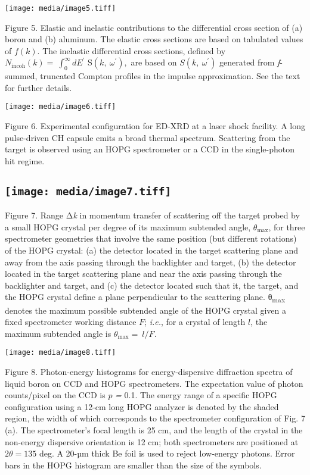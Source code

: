 \texttt{[image: media/image5.tiff]}

Figure 5. Elastic and inelastic contributions to the differential cross
section of (a) boron and (b) aluminum. The elastic cross sections are
based on tabulated values of \(f(k)\). The inelastic differential cross
sections, defined by
\(N_{\text{incoh}}\left( k \right) = \ \int_{0}^{\infty}{dE^{'}}\text{\ S}\left( k,\ \omega^{'} \right),\)
are based on \(S\left( k,\ \omega^{'} \right)\) generated from
\emph{f}-summed, truncated Compton profiles in the impulse
approximation. See the text for further details.

\texttt{[image: media/image6.tiff]}

Figure 6. Experimental configuration
for ED-XRD at a laser shock facility. A long pulse-driven CH capsule
emits a broad thermal spectrum. Scattering from the target is observed
using an HOPG spectrometer or a CCD in the single-photon hit regime.

\subsection{\texorpdfstring{\protect\texttt{[image: media/image7.tiff]}}{}}\label{section-4}

Figure 7. Range Δ\emph{k} in momentum transfer of scattering off the
target probed by a small HOPG crystal per degree of its maximum
subtended angle, \(\theta_{\max}\), for three spectrometer geometries
that involve the same position (but different rotations) of the HOPG
crystal: (a) the detector located in the target scattering plane and
away from the axis passing through the backlighter and target, (b) the
detector located in the target scattering plane and near the axis
passing through the backlighter and target, and (c) the detector located
such that it, the target, and the HOPG crystal define a plane
perpendicular to the scattering plane. θ\textsubscript{max} denotes the
maximum possible subtended angle of the HOPG crystal given a fixed
spectrometer working distance \(F\); \emph{i.e.}, for a crystal of
length \(l\), the maximum subtended angle is
\(\theta_{\max} = \ l/F\)\emph{.}


\texttt{[image: media/image8.tiff]}

Figure 8. Photon-energy histograms for energy-dispersive diffraction
spectra of liquid boron on CCD and HOPG spectrometers. The expectation
value of photon counts/pixel on the CCD is \(p\) \emph{=} 0.1. The
energy range of a specific HOPG configuration using a 12-cm long HOPG
analyzer is denoted by the shaded region, the width of which corresponds
to the spectrometer configuration of Fig. 7 (a). The spectrometer's
focal length is 25 cm, and the length of the crystal in the non-energy
dispersive orientation is 12 cm; both spectrometers are positioned at
\(2\theta = 135\) deg. A 20-µm thick Be foil is used to reject
low-energy photons. Error bars in the HOPG histogram are smaller than
the size of the symbols.

